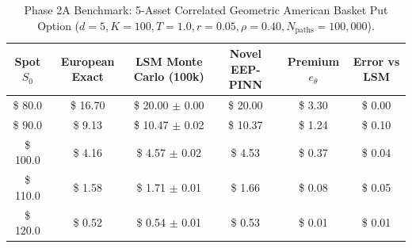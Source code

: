 \begin{table}[h!]
\centering
\small
\caption{Phase 2A Benchmark: 5-Asset Correlated Geometric American Basket Put Option ($d=5, K=100, T=1.0, r=0.05, \rho=0.40, N_{\text{paths}}=100,000$).}
\label{tab:multid_geom_benchmarks}
\begin{tabular}{@{}cccccc@{}}
\toprule
\textbf{Spot $S_0$} & \textbf{European Exact} & \textbf{LSM Monte Carlo (100k)} & \textbf{Novel EEP-PINN} & \textbf{Premium $e_\theta$} & \textbf{Error vs LSM} \\ \midrule
\$ 80.0 & \$ 16.70 & \$ 20.00 $\pm$ 0.00 & \$ 20.00 & \$ 3.30 & \$ 0.00 \\
\$ 90.0 & \$ 9.13 & \$ 10.47 $\pm$ 0.02 & \$ 10.37 & \$ 1.24 & \$ 0.10 \\
\$ 100.0 & \$ 4.16 & \$ 4.57 $\pm$ 0.02 & \$ 4.53 & \$ 0.37 & \$ 0.04 \\
\$ 110.0 & \$ 1.58 & \$ 1.71 $\pm$ 0.01 & \$ 1.66 & \$ 0.08 & \$ 0.05 \\
\$ 120.0 & \$ 0.52 & \$ 0.54 $\pm$ 0.01 & \$ 0.53 & \$ 0.01 & \$ 0.01 \\
\bottomrule
\end{tabular}
\end{table}
